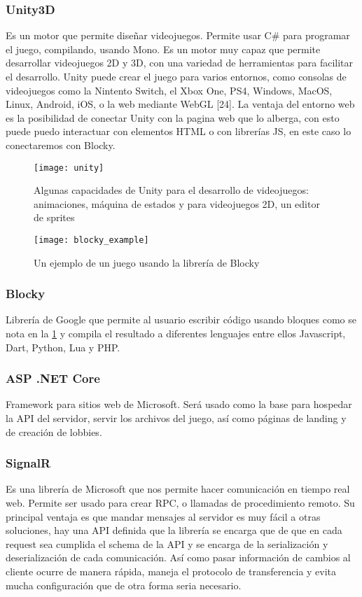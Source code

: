 \subsubsection{Unity3D}
Es un motor que permite diseñar videojuegos. Permite usar C\# para programar el juego, compilando, usando Mono. \cite{unity2019} Es un motor muy capaz que permite desarrollar videojuegos 2D y 3D, con una variedad de herramientas para facilitar el desarrollo.
Unity puede crear el juego para varios entornos, como consolas de videojuegos como la Nintento Switch, el Xbox One, PS4, Windows, MacOS, Linux, Android, iOS, o la web mediante WebGL [24]. La ventaja del entorno web es la posibilidad de conectar Unity con la pagina web que lo alberga, con esto puede puedo interactuar con elementos HTML o con librerías JS, en este caso lo conectaremos con Blocky.
\begin{figure}
    \caption{Algunas capacidades de Unity para el desarrollo de videojuegos: animaciones, máquina de estados y para videojuegos 2D, un editor de sprites}
    \centering
    \texttt{[image: unity]}
\end{figure}

\begin{figure}
    \caption{Un ejemplo de un juego usando la librería de Blocky}
    \centering
    \texttt{[image: blocky\_example]}
    \label{fig:blocky_example}
\end{figure}

\subsubsection{Blocky}
Librería de Google que permite al usuario escribir código usando bloques como se nota en la \ref{fig:blocky_example} y compila el resultado a diferentes lenguajes entre ellos Javascript, Dart, Python, Lua y PHP.

\subsubsection{ASP .NET Core}
Framework para sitios web de Microsoft. Será usado como la base para hospedar la API del servidor, servir los archivos del juego, así como páginas de landing y de creación de lobbies.

\subsubsection{SignalR}
Es una librería de Microsoft que nos permite hacer comunicación en tiempo real web. Permite ser usado para crear RPC, o llamadas de procedimiento remoto. Su principal ventaja es que mandar mensajes al servidor es muy fácil a otras soluciones, hay una API definida que la librería se encarga que de que en cada request sea cumplida el schema de la API y se encarga de la serialización y deserialización de cada comunicación. Así como pasar información de cambios al cliente ocurre de manera rápida, maneja el protocolo de transferencia y evita mucha configuración que de otra forma seria necesario.

